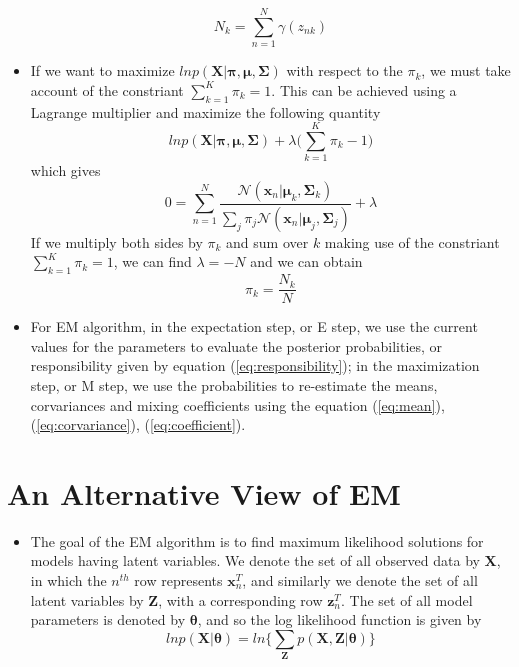 \documentclass[12pt, a4paper]{article}
\newcommand{\N}{\mathcal{N}}
\begin{document}
\begin{itemize}
\begin{equation}
            N_k=\sum_{n=1}^N\gamma(z_{nk})
        \end{equation}
        \item If we want to maximize $lnp(\mathbf{X}|\bm{\pi},\bm{\mu},\mathbf{\Sigma})$
        with respect to the $\pi_k$, we must take account of the constriant $\sum_{k=1}
        ^K\pi_k=1$. This can be achieved using a Lagrange multiplier and maximize the 
        following quantity
        \begin{equation}
            lnp(\mathbf{X}|\bm{\pi},\bm{\mu},\mathbf{\Sigma})+\lambda\Big(
                \sum_{k=1}^K\pi_k-1\Big)
        \end{equation}
        which gives
        \begin{equation}
            0=\sum_{n=1}^N\frac{\N(\bm{x}_n|\bm{\mu}_k,\mathbf{\Sigma}_k)}
            {\sum_j\pi_j\N(\bm{x}_n|\bm{\mu}_j,\mathbf{\Sigma}_j)}+\lambda
        \end{equation}
        If we multiply both sides by $\pi_k$ and sum over $k$ making use of the 
        constriant $\sum_{k=1}^K\pi_k=1$, we can find $\lambda=-N$ and we can obtain
        \begin{equation}
            \label{eq:coefficient}
            \pi_k=\frac{N_k}{N}
        \end{equation}
        \item For EM algorithm, in the expectation step, or E step, we use the current
        values for the parameters to evaluate the posterior probabilities, or 
        responsibility given by equation (\ref{eq:responsibility}); in the maximization
        step, or M step, we use the probabilities to re-estimate the means, corvariances
        and mixing coefficients using the equation (\ref{eq:mean}), 
        (\ref{eq:corvariance}), (\ref{eq:coefficient}). 
    \end{itemize}
    \section{An Alternative View of EM}
    \begin{itemize}
        \item The goal of the EM algorithm is to find maximum likelihood solutions for 
        models having latent variables. We denote the set of all observed data by 
        $\mathbf{X}$, in which the $n^{th}$ row represents $\bm{x}_n^T$, and similarly
        we denote the set of all latent variables by $\mathbf{Z}$, with a corresponding
        row $\bm{z}_n^T$. The set of all model parameters is denoted by $\bm{\theta}$, 
        and so the log likelihood function is given by
        \begin{equation}
            ln p(\mathbf{X}|\bm{\theta})=ln\Big\{\sum_{\mathbf{Z}}p(\mathbf{X},
            \mathbf{Z}|\bm{\theta}) \Big\}
        \end{equation}
    \end{itemize}
\end{document}
